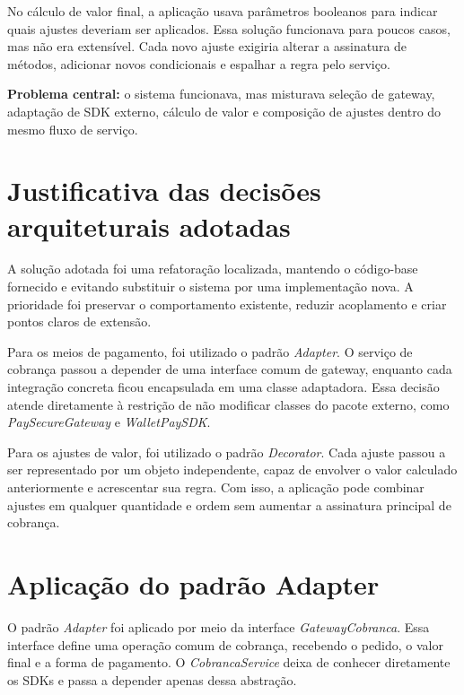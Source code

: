 \documentclass[12pt,a4paper]{article}
\begin{document}
No cálculo de valor final, a aplicação usava parâmetros booleanos para indicar quais ajustes deveriam ser aplicados. Essa solução funcionava para poucos casos, mas não era extensível. Cada novo ajuste exigiria alterar a assinatura de métodos, adicionar novos condicionais e espalhar a regra pelo serviço.

\begin{resultbox}
\textbf{Problema central:} o sistema funcionava, mas misturava seleção de gateway, adaptação de SDK externo, cálculo de valor e composição de ajustes dentro do mesmo fluxo de serviço.
\end{resultbox}

\section{Justificativa das decisões arquiteturais adotadas}

A solução adotada foi uma refatoração localizada, mantendo o código-base fornecido e evitando substituir o sistema por uma implementação nova. A prioridade foi preservar o comportamento existente, reduzir acoplamento e criar pontos claros de extensão.

Para os meios de pagamento, foi utilizado o padrão \textit{Adapter}. O serviço de cobrança passou a depender de uma interface comum de gateway, enquanto cada integração concreta ficou encapsulada em uma classe adaptadora. Essa decisão atende diretamente à restrição de não modificar classes do pacote externo, como \textit{PaySecureGateway} e \textit{WalletPaySDK}.

Para os ajustes de valor, foi utilizado o padrão \textit{Decorator}. Cada ajuste passou a ser representado por um objeto independente, capaz de envolver o valor calculado anteriormente e acrescentar sua regra. Com isso, a aplicação pode combinar ajustes em qualquer quantidade e ordem sem aumentar a assinatura principal de cobrança.

\section{Aplicação do padrão Adapter}

O padrão \textit{Adapter} foi aplicado por meio da interface \textit{GatewayCobranca}. Essa interface define uma operação comum de cobrança, recebendo o pedido, o valor final e a forma de pagamento. O \textit{CobrancaService} deixa de conhecer diretamente os SDKs e passa a depender apenas dessa abstração.
\end{document}
